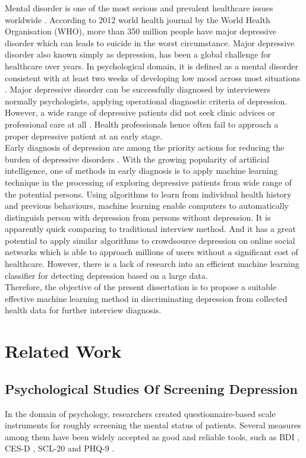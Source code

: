 \documentclass[12pt]{article}
\begin{document}
Mental disorder is one of the most serious and prevalent healthcare issues worldwide \cite{Wongkoblap}. According to 2012 world health journal by the World Health Organisation (WHO), more than 350 million people have major depressive disorder which can leads to suicide in the worst circumstance. Major depressive disorder also known simply as depression, has been a global challenge for healthcare over years. In psychological domain, it is defined as a mental disorder consistent with at least two weeks of developing low mood across most situations \cite{Zimmerman}. Major depressive disorder can be successfully diagnosed by interviewers normally psychologists, applying operational diagnostic criteria of depression. However, a wide range of depressive patients did not seek clinic advices or professional care at all \cite{Huerta-Ramirez}. Health professionals hence often fail to approach a proper depressive patient at an early stage. 
\\

Early diagnosis of depression are among the priority actions for reducing the burden of depressive disorders \cite{Huerta-Ramirez}. With the growing popularity of artificial intelligence, one of methods in early diagnosis is to apply machine learning technique in the processing of exploring depressive patients from wide range of the potential persons. Using algorithms to learn from individual health history and previous behaviours, machine learning enable computers to automatically distinguish person with depression from persons without depression. It is apparently quick comparing to traditional interview method. And it has a great potential to apply similar algorithms to crowdsource depression on online social networks which is able to approach millions of users without a significant cost of healthcare. However, there is a lack of research into an efficient machine learning classifier for detecting depression based on a large data.
\\

Therefore, the objective of the present dissertation is to propose a suitable effective machine learning method in discriminating depression from collected health data for further interview diagnosis. 
\bigskip
\goodbreak
\section{Related Work}
\subsection{Psychological Studies Of Screening Depression}
In the domain of psychology, researchers created questionnaire-based scale instruments for roughly screening the mental status of patients. Several measures among them have been widely accepted as good and reliable tools, such as BDI \cite{Huerta-Ramirez}\cite{Tsugawa}, CES-D \cite{De Choudhury}\cite{Tsugawa}, SCL-20 and PHQ-9 \cite{Kroenke}. \\
\end{document}
